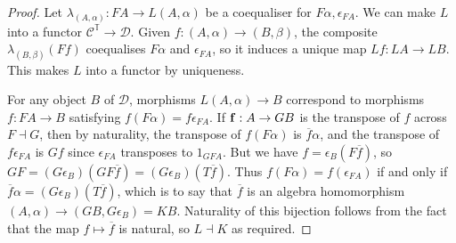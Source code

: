 \begin{proof}
    Let \( \lambda_{(A, \alpha)} : FA \to L(A, \alpha) \) be a coequaliser for \( F\alpha, \epsilon_{FA} \).
    We can make \( L \) into a functor \( \mathcal C^{\mathbb T} \to \mathcal D \).
    Given \( f : (A, \alpha) \to (B, \beta) \), the composite \( \lambda_{(B, \beta)} (Ff) \) coequalises \( F\alpha \) and \( \epsilon_{FA} \), so it induces a unique map \( Lf : LA \to LB \).
    This makes \( L \) into a functor by uniqueness.

    For any object \( B \) of \( \mathcal D \), morphisms \( L(A, \alpha) \to B \) correspond to morphisms \( f : FA \to B \) satisfying \( f(F\alpha) = f \epsilon_{FA} \).
    If \( \vb f : A \to GB \) is the transpose of \( f \) across \( F \dashv G \), then by naturality, the transpose of \( f(F\alpha) \) is \( \overline f \alpha \), and the transpose of \( f \epsilon_{FA} \) is \( Gf \) since \( \epsilon_{FA} \) transposes to \( 1_{GFA} \).
    But we have \( f = \epsilon_B (F\overline f) \), so \( GF = (G \epsilon_B)(GF \overline f) = (G\epsilon_B)(T\overline f) \).
    Thus \( f(F\alpha) = f(\epsilon_{FA}) \) if and only if \( \overline f \alpha = (G\epsilon_B)(T \overline f) \), which is to say that \( \overline f \) is an algebra homomorphism \( (A, \alpha) \to (GB, G\epsilon_B) = KB \).
    Naturality of this bijection follows from the fact that the map \( f \mapsto \overline f \) is natural, so \( L \dashv K \) as required.
\end{proof}
